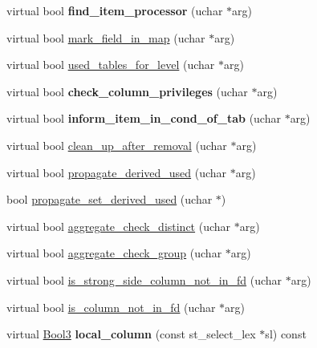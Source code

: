 \begin{DoxyCompactItemize}
\mbox{\label{classItem_ac8f6b287984e09b06d16f6c1b75eed0e}} 
virtual bool {\bfseries find\+\_\+item\+\_\+processor} (uchar $\ast$arg)
\item 
virtual bool \mbox{\hyperlink{classItem_ada2ce79ccf5ef1273b9e1654448944c1}{mark\+\_\+field\+\_\+in\+\_\+map}} (uchar $\ast$arg)
\item 
virtual bool \mbox{\hyperlink{classItem_af55c5ec69663eb6a1b98f071232a7aa2}{used\+\_\+tables\+\_\+for\+\_\+level}} (uchar $\ast$arg)
\item 
\mbox{\label{classItem_a7ef2237e207688ebc212d481730f2167}} 
virtual bool {\bfseries check\+\_\+column\+\_\+privileges} (uchar $\ast$arg)
\item 
\mbox{\label{classItem_a99333408f695737ac6b86e9734d5f47c}} 
virtual bool {\bfseries inform\+\_\+item\+\_\+in\+\_\+cond\+\_\+of\+\_\+tab} (uchar $\ast$arg)
\item 
virtual bool \mbox{\hyperlink{classItem_a649bf72a4ae639e262d147cf5beaa30a}{clean\+\_\+up\+\_\+after\+\_\+removal}} (uchar $\ast$arg)
\item 
virtual bool \mbox{\hyperlink{classItem_ac2caaead7a0c527f9e3968532a00f4ef}{propagate\+\_\+derived\+\_\+used}} (uchar $\ast$arg)
\item 
bool \mbox{\hyperlink{classItem_ae91bed467907fd1e3720f7caaaba120f}{propagate\+\_\+set\+\_\+derived\+\_\+used}} (uchar $\ast$)
\item 
virtual bool \mbox{\hyperlink{classItem_a7291ce9a64c0201c71463033b4346df4}{aggregate\+\_\+check\+\_\+distinct}} (uchar $\ast$arg)
\item 
virtual bool \mbox{\hyperlink{classItem_ab828d3602e63ad15f5cfd8ff54339189}{aggregate\+\_\+check\+\_\+group}} (uchar $\ast$arg)
\item 
virtual bool \mbox{\hyperlink{classItem_a6f6cf3b5317dce7e27b04c4eaaa37f89}{is\+\_\+strong\+\_\+side\+\_\+column\+\_\+not\+\_\+in\+\_\+fd}} (uchar $\ast$arg)
\item 
virtual bool \mbox{\hyperlink{classItem_a24e82d279a8907ad502faebb3abe1ab1}{is\+\_\+column\+\_\+not\+\_\+in\+\_\+fd}} (uchar $\ast$arg)
\item 
\mbox{\label{classItem_aeb09f698fb93aedea872783b5bebe5c0}} 
virtual \mbox{\hyperlink{classBool3}{Bool3}} {\bfseries local\+\_\+column} (const st\+\_\+select\+\_\+lex $\ast$sl) const
\item 

\end{DoxyCompactItemize}
